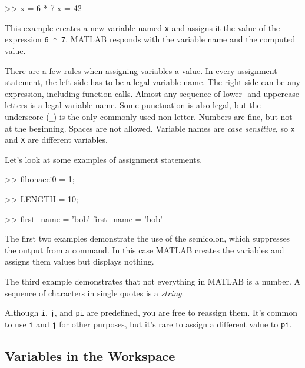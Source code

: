 
\begin{code}
>> x = 6 * 7
x = 42
\end{code}

This example creates a new variable named \lstinline{x} and assigns it the
value of the expression \lstinline{6 * 7}.  MATLAB responds with the
variable name and the computed value.


There are a few rules when assigning variables a value. In every assignment statement, the left side has to be a legal variable name.  The right side can be any expression, including function calls.
%
%
%
%
Almost any sequence of lower- and uppercase letters is a legal
variable name.
Some punctuation is also legal, but the underscore (\lstinline{_}) is the only commonly used non-letter.
Numbers are fine, but not at the beginning.
Spaces are not allowed.  Variable names are
\emph{case sensitive}, so \lstinline{x} and \lstinline{X} are different variables.

Let's look at some examples of assignment statements.

\begin{code}
>> fibonacci0 = 1;

>> LENGTH = 10;

>> first_name = 'bob'
first_name = 'bob'
\end{code}

The first two examples demonstrate the use of the semicolon, which
suppresses the output from a command.  In this case MATLAB creates the
variables and assigns them values but displays nothing.
%
%
%
%

The third example demonstrates that not everything
in MATLAB is a number.
A sequence of characters in single quotes is
a \emph{string}.


Although \lstinline{i}, \lstinline{j}, and \lstinline{pi} are predefined, you are free
to reassign them.  It's common to use \lstinline{i} and \lstinline{j} for other
purposes, but it's rare to assign a different value to
\lstinline{pi}.



\subsection{Variables in the Workspace}

